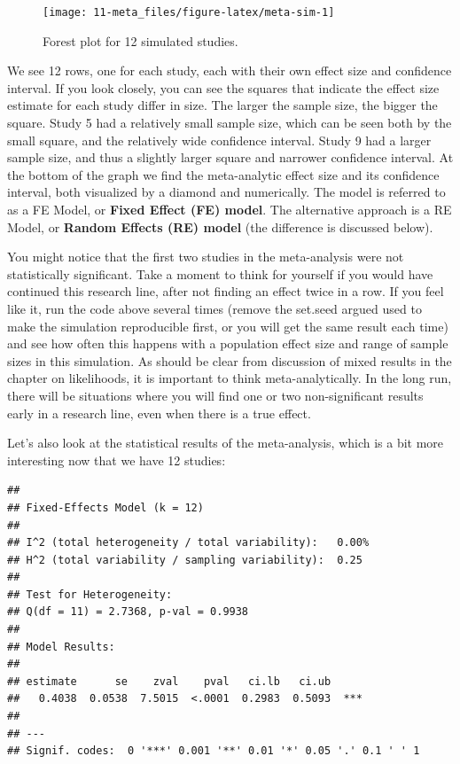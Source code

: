 \documentclass[
  oneside]{book}
\begin{document}
\begin{figure}

{\centering \texttt{[image: 11-meta\_files/figure-latex/meta-sim-1]} 

}

\caption{Forest plot for 12 simulated studies.}\label{fig:meta-sim}
\end{figure}

We see 12 rows, one for each study, each with their own effect size and confidence interval. If you look closely, you can see the squares that indicate the effect size estimate for each study differ in size. The larger the sample size, the bigger the square. Study 5 had a relatively small sample size, which can be seen both by the small square, and the relatively wide confidence interval. Study 9 had a larger sample size, and thus a slightly larger square and narrower confidence interval. At the bottom of the graph we find the meta-analytic effect size and its confidence interval, both visualized by a diamond and numerically. The model is referred to as a FE Model, or \textbf{Fixed Effect (FE) model}. The alternative approach is a RE Model, or \textbf{Random Effects (RE) model} (the difference is discussed below).

You might notice that the first two studies in the meta-analysis were not statistically significant. Take a moment to think for yourself if you would have continued this research line, after not finding an effect twice in a row. If you feel like it, run the code above several times (remove the set.seed argued used to make the simulation reproducible first, or you will get the same result each time) and see how often this happens with a population effect size and range of sample sizes in this simulation. As should be clear from discussion of mixed results in the chapter on likelihoods, it is important to think meta-analytically. In the long run, there will be situations where you will find one or two non-significant results early in a research line, even when there is a true effect.

Let's also look at the statistical results of the meta-analysis, which is a bit more interesting now that we have 12 studies:

\begin{verbatim}
## 
## Fixed-Effects Model (k = 12)
## 
## I^2 (total heterogeneity / total variability):   0.00%
## H^2 (total variability / sampling variability):  0.25
## 
## Test for Heterogeneity:
## Q(df = 11) = 2.7368, p-val = 0.9938
## 
## Model Results:
## 
## estimate      se    zval    pval   ci.lb   ci.ub 
##   0.4038  0.0538  7.5015  <.0001  0.2983  0.5093  *** 
## 
## ---
## Signif. codes:  0 '***' 0.001 '**' 0.01 '*' 0.05 '.' 0.1 ' ' 1
\end{verbatim}
\end{document}

